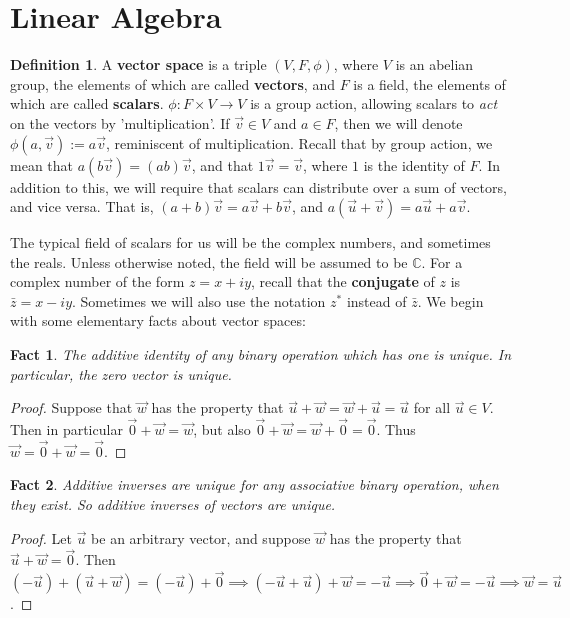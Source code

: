 \documentclass{article}
\theoremstyle{definition}
\newtheorem{definition}{Definition}[section]
\theoremstyle{plain}
\theoremstyle{theorem}
\newtheorem{fact}{Fact}[section]
\begin{document}
\section{Linear Algebra}
\begin{definition}
		A \textbf{vector space} is a triple $(V,F,\phi)$, where $V$ is an abelian group, the elements of which are called \textbf{vectors}, and $F$ is a field, the elements of which are called \textbf{scalars}. $\phi: F \times V \to V$ is a group action, allowing scalars to \textit{act} on the vectors by 'multiplication'. If $\vec{v} \in V$ and $a \in F$, then we will denote $\phi(a,\vec{v}) := a\vec{v}$, reminiscent of multiplication. Recall that by group action, we mean that $a(b\vec{v}) = (ab)\vec{v}$, and that $1\vec{v} = \vec{v}$, where $1$ is the identity of $F$. In addition to this, we will require that scalars can distribute over a sum of vectors, and vice versa. That is, $(a+b)\vec{v} = a\vec{v}+b\vec{v}$, and $a(\vec{u}+\vec{v}) = a\vec{u}+a\vec{v}$.
	\end{definition}
	The typical field of scalars for us will be the complex numbers, and sometimes the reals. Unless otherwise noted, the field will be assumed to be $\mathbb{C}$. For a complex number of the form $z = x+iy$, recall that the \textbf{conjugate} of $z$ is $\bar{z} = x-iy$. Sometimes we will also use the notation $z^*$ instead of $\bar{z}$. We begin with some elementary facts about vector spaces:
	\begin{fact}
		The additive identity of any binary operation which has one is unique. In particular, the zero vector is unique. 
	\end{fact}
	\begin{proof}
		Suppose that $\vec{w}$ has the property that $\vec{u}+\vec{w} = \vec{w}+\vec{u}=\vec{u}$ for all $\vec{u} \in V$. Then in particular $\vec{0}+\vec{w} = \vec{w}$, but also $\vec{0}+\vec{w} = \vec{w}+\vec{0} =\vec{0}$. Thus $\vec{w} = \vec{0}+\vec{w} = \vec{0}$. 
	\end{proof}
	\begin{fact}
		Additive inverses are unique for any associative binary operation, when they exist. So additive inverses of vectors are unique.
	\end{fact}
	\begin{proof}
		Let $\vec{u}$ be an arbitrary vector, and suppose $\vec{w}$ has the property that $\vec{u}+\vec{w} = \vec{0}$. Then $(-\vec{u})+(\vec{u}+\vec{w}) = (-\vec{u})+\vec{0} \implies (-\vec{u}+\vec{u})+\vec{w} = -\vec{u} \implies \vec{0}+\vec{w} = -\vec{u} \implies \vec{w} = \vec{u}$.
	\end{proof}
\end{document}
